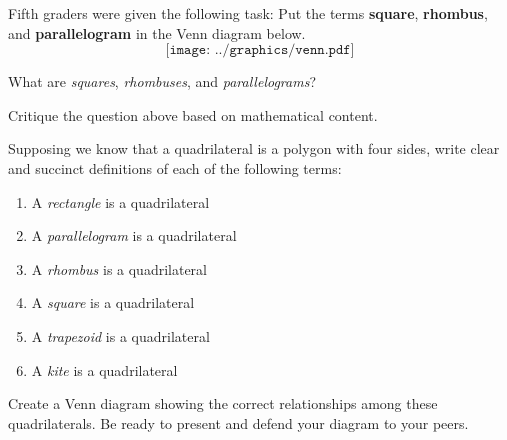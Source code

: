 Fifth graders were given the following task: Put the
terms \textbf{square}, \textbf{rhombus}, and \textbf{parallelogram} in
the Venn diagram below.
\[
\texttt{[image: ../graphics/venn.pdf]}
\]


\begin{prob} 
What are \textit{squares}, \textit{rhombuses}, and
 \textit{parallelograms}?    
\end{prob}
\vspace{1in}

\begin{prob} 
Critique the question above based on mathematical content.
\end{prob}

\newpage 
\begin{prob}
Supposing we know that a quadrilateral is a polygon with four sides, write clear and succinct definitions of each of the following terms: 
\begin{enumerate}
\itemsep18pt
\item A \textit{rectangle} is a quadrilateral 
\item A \textit{parallelogram} is a quadrilateral
\item A \textit{rhombus} is a quadrilateral
\item A \textit{square} is a quadrilateral
\item A \textit{trapezoid} is a quadrilateral
\item A \textit{kite} is a quadrilateral
\end{enumerate}
\end{prob}
\bigskip

\begin{prob} 
Create a Venn diagram showing the correct relationships
among these quadrilaterals. Be ready to present and defend your
diagram to your peers.
\end{prob}
